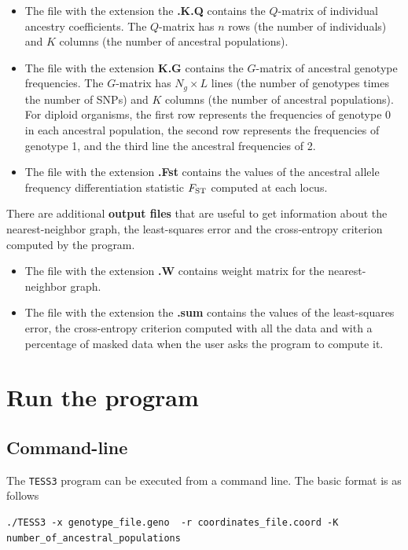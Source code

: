 \documentclass[10pt,a4paper]{article}
\begin{document}
\begin{itemize}
\item The file with the extension the {\bf .K.Q} contains the $Q$-matrix of individual ancestry coefficients.
The $Q$-matrix has $n$ rows (the number of individuals) and $K$ columns (the number of ancestral populations).
\item The file with the extension {\bf K.G} contains the $G$-matrix of ancestral genotype frequencies.
The $G$-matrix has $N_g\times L$ lines (the number of genotypes times the number of SNPs) and $K$ columns (the number of ancestral populations). For diploid organisms, the first row represents the frequencies of genotype 0 in each ancestral population, the second row represents the frequencies of genotype 1, and the third line the ancestral frequencies of 2.
\item The file with the extension {\bf .Fst} contains the values of the ancestral allele frequency differentiation statistic $F_{\rm ST}$ computed at each locus.  
\end{itemize}

There are additional {\bf output files} that are useful to get information about the nearest-neighbor graph, the least-squares error and the cross-entropy criterion computed by the program.

\begin{itemize}
\item The file with the extension {\bf .W} contains weight matrix for the nearest-neighbor graph.
\item The file with the extension the {\bf .sum} contains the values of the least-squares error, the cross-entropy criterion computed with all the data and with a percentage of masked data when the user asks the program to compute it.
\end{itemize}

\section{Run the program}
\subsection{Command-line}
The {\tt TESS3} program can be executed from a command line. The basic format is as follows
\begin{Verbatim}[frame=single]
./TESS3 -x genotype_file.geno  -r coordinates_file.coord -K number_of_ancestral_populations
\end{Verbatim}
\end{document}
